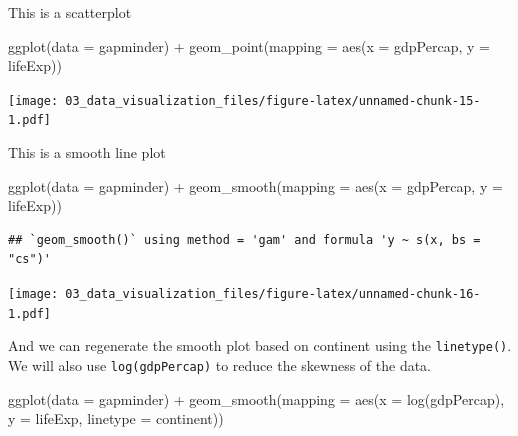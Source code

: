 \documentclass[
  10pt,
]{krantz}
\newenvironment{Shaded}{\begin{snugshade}}{\end{snugshade}}
\newcommand{\AttributeTok}[1]{\textcolor[rgb]{0.77,0.63,0.00}{#1}}
\newcommand{\FunctionTok}[1]{\textcolor[rgb]{0.00,0.00,0.00}{#1}}
\newcommand{\NormalTok}[1]{#1}
\newcommand{\SpecialCharTok}[1]{\textcolor[rgb]{0.00,0.00,0.00}{#1}}
\begin{document}
This is a scatterplot

\begin{Shaded}
\begin{Highlighting}[]
\FunctionTok{ggplot}\NormalTok{(}\AttributeTok{data =}\NormalTok{ gapminder) }\SpecialCharTok{+}
  \FunctionTok{geom\_point}\NormalTok{(}\AttributeTok{mapping =} \FunctionTok{aes}\NormalTok{(}\AttributeTok{x =}\NormalTok{ gdpPercap, }\AttributeTok{y =}\NormalTok{ lifeExp))}
\end{Highlighting}
\end{Shaded}

\texttt{[image: 03\_data\_visualization\_files/figure-latex/unnamed-chunk-15-1.pdf]}

This is a smooth line plot

\begin{Shaded}
\begin{Highlighting}[]
\FunctionTok{ggplot}\NormalTok{(}\AttributeTok{data =}\NormalTok{ gapminder) }\SpecialCharTok{+}
  \FunctionTok{geom\_smooth}\NormalTok{(}\AttributeTok{mapping =} \FunctionTok{aes}\NormalTok{(}\AttributeTok{x =}\NormalTok{ gdpPercap, }\AttributeTok{y =}\NormalTok{ lifeExp))}
\end{Highlighting}
\end{Shaded}

\begin{verbatim}
## `geom_smooth()` using method = 'gam' and formula 'y ~ s(x, bs = "cs")'
\end{verbatim}

\texttt{[image: 03\_data\_visualization\_files/figure-latex/unnamed-chunk-16-1.pdf]}

And we can regenerate the smooth plot based on continent using the \texttt{linetype()}. We will also use \texttt{log(gdpPercap)} to reduce the skewness of the data.

\begin{Shaded}
\begin{Highlighting}[]
\FunctionTok{ggplot}\NormalTok{(}\AttributeTok{data =}\NormalTok{ gapminder) }\SpecialCharTok{+}
  \FunctionTok{geom\_smooth}\NormalTok{(}\AttributeTok{mapping =} \FunctionTok{aes}\NormalTok{(}\AttributeTok{x =} \FunctionTok{log}\NormalTok{(gdpPercap), }
                            \AttributeTok{y =}\NormalTok{ lifeExp, }
                            \AttributeTok{linetype =}\NormalTok{ continent))}
\end{Highlighting}
\end{Shaded}
\end{document}
